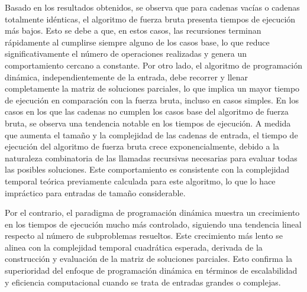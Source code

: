 Basado en los resultados obtenidos, se observa que para cadenas vacías o cadenas totalmente idénticas, el algoritmo de fuerza bruta presenta tiempos de ejecución más bajos. Esto se debe a que, en estos casos, las recursiones terminan rápidamente al cumplirse siempre alguno de los casos base, lo que reduce significativamente el número de operaciones realizadas y genera un comportamiento cercano a constante. Por otro lado, el algoritmo de programación dinámica, independientemente de la entrada, debe recorrer y llenar completamente la matriz de soluciones parciales, lo que implica un mayor tiempo de ejecución en comparación con la fuerza bruta, incluso en casos simples.
En los casos en los que las cadenas no cumplen los casos base del algoritmo de fuerza bruta, se observa una tendencia notable en los tiempos de ejecución. A medida que aumenta el tamaño y la complejidad de las cadenas de entrada, el tiempo de ejecución del algoritmo de fuerza bruta crece exponencialmente, debido a la naturaleza combinatoria de las llamadas recursivas necesarias para evaluar todas las posibles soluciones. Este comportamiento es consistente con la complejidad temporal teórica previamente calculada para este algoritmo, lo que lo hace impráctico para entradas de tamaño considerable.

Por el contrario, el paradigma de programación dinámica muestra un crecimiento en los tiempos de ejecución mucho más controlado, siguiendo una tendencia lineal respecto al número de subproblemas resueltos. Este crecimiento más lento se alinea con la complejidad temporal cuadrática esperada, derivada de la construcción y evaluación de la matriz de soluciones parciales. Esto confirma la superioridad del enfoque de programación dinámica en términos de escalabilidad y eficiencia computacional cuando se trata de entradas grandes o complejas.